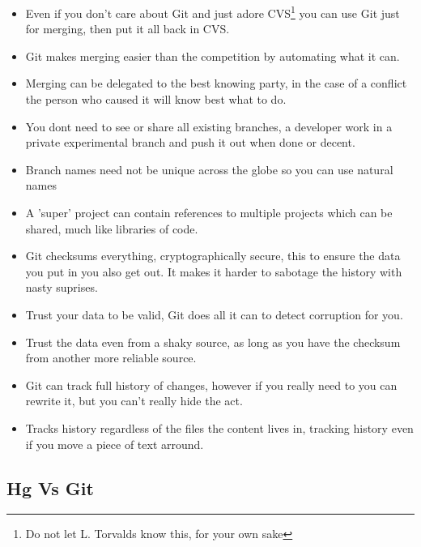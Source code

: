 \begin{itemize}
\item
Even if you don't care about Git and just adore CVS\footnote{Do not let L. Torvalds know this, for your own sake}
you can use Git just for merging, then put it all back in CVS.

\item
Git makes merging easier than the competition by automating what it can.

\item
Merging can be delegated to the best knowing party, in the case of a conflict the person who caused it will know best what to do.

\item
You dont need to see or share all existing branches, a developer work in a private experimental branch and push it out when done or decent.

\item
Branch names need not be unique across the globe so you can use natural names

\item
A 'super' project can contain references to multiple projects which can be shared, much like libraries of code.

\item
Git checksums everything, cryptographically secure, this to ensure the data you put in you also get out. It makes it harder to sabotage the history with nasty suprises.

\item
Trust your data to be valid, Git does all it can to detect corruption for you.

\item Trust the data even from a shaky source, as long as you have the checksum from another more reliable source.


\item
Git can track full history of changes, however if you really need to you can rewrite it, but you can't really hide the act.

\item 
Tracks history regardless of the files the content lives in, tracking history even if you move a piece of text arround.

\end{itemize}


\subsection{Hg Vs Git}
\label{sect:rebase}

